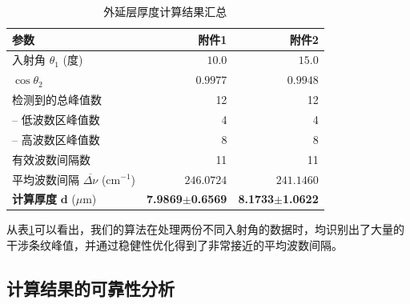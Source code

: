 \documentclass[withoutpreface,bwprint]{cumcmthesis} %
\begin{document}
\begin{table}[htbp]
    \centering
    \caption{外延层厚度计算结果汇总}
    \label{tab:results_q2}
    \begin{tabular}{lrr}
        \toprule
        \textbf{参数}                               & \textbf{附件1}                             & \textbf{附件2}                             \\
        \midrule
        入射角 $\theta_1$ (度)                        & $10.0$                                   & $15.0$                                   \\
        $\cos\theta_2$                            & $0.9977$                                 & $0.9948$                                 \\
        检测到的总峰值数                                  & 12                                       & 12                                       \\
        \quad -- 低波数区峰值数                          & 4                                        & 4                                        \\
        \quad -- 高波数区峰值数                          & 8                                        & 8                                        \\
        有效波数间隔数                                   & 11                                       & 11                                       \\
        平均波数间隔 $\overline{\Delta\nu}$ (cm$^{-1}$) & $246.0724$                               & $241.1460$                               \\
        \textbf{计算厚度} $\bm{d}$ ($\mu$m)           & \textbf{7.9869}$\bm{\pm}$\textbf{0.6569} & \textbf{8.1733}$\bm{\pm}$\textbf{1.0622} \\
        \bottomrule
    \end{tabular}
\end{table}

从表\ref{tab:results_q2}可以看出，我们的算法在处理两份不同入射角的数据时，均识别出了大量的干涉条纹峰值，并通过稳健性优化得到了非常接近的平均波数间隔。


\subsection{计算结果的可靠性分析}
\end{document}
